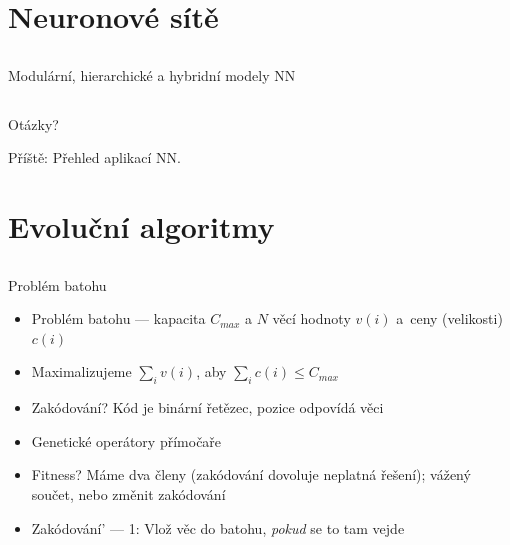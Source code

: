 \documentclass{beamer}
\begin{document}
\section{Neuronové sítě}

\subsection{}
\begin{frame}{Modulární, hierarchické a hybridní modely NN}
\end{frame}

\subsection{}
\begin{frame}{Otázky?}
\begin{center}
Příště: Přehled aplikací NN.
\end{center}
\end{frame}

\section{Evoluční algoritmy}

\subsection{}
\begin{frame}{Problém batohu}
\begin{itemize}
\item Problém batohu --- kapacita $C_{max}$ a $N$ věcí hodnoty $v(i)$ a~ceny (velikosti) $c(i)$
\item Maximalizujeme $\sum_i v(i)$, aby $\sum_i c(i) \le C_{max}$
\item Zakódování? \pause Kód je binární řetězec, pozice odpovídá věci
\item Genetické operátory přímočaře
\item Fitness? \pause Máme dva členy (zakódování dovoluje neplatná řešení); vážený součet, nebo změnit zakódování
\pause
\item Zakódování' --- 1: Vlož věc do batohu, {\em pokud} se to tam vejde
\end{itemize}
\end{frame}
\end{document}
